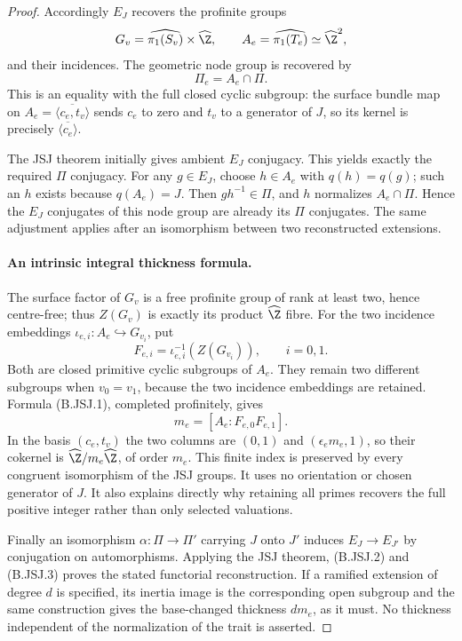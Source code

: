 \begin{proof}
Accordingly $E_J$ recovers the profinite groups
\[
 G_v=\widehat{\pi_1(S_v)}\times\widehat\Z,
 \qquad A_e=\widehat{\pi_1(T_e)}\simeq\widehat\Z^2,
\]
and their incidences. The geometric node group is recovered by
\[
                         \Pi_e=A_e\cap\Pi.
\tag{B.JSJ.2}
\]
This is an equality with the full closed cyclic subgroup: the surface
bundle map on $A_e=\overline{\langle c_e,t_v\rangle}$ sends $c_e$
to zero and $t_v$ to a generator of $J$, so its kernel is precisely
$\overline{\langle c_e\rangle}$.

The JSJ theorem initially gives ambient $E_J$ conjugacy. This yields
exactly the required $\Pi$ conjugacy. For any $g\in E_J$, choose
$h\in A_e$ with $q(h)=q(g)$; such an $h$ exists because
$q(A_e)=J$. Then $gh^{-1}\in\Pi$, and $h$ normalizes
$A_e\cap\Pi$. Hence the $E_J$ conjugates of this node group are
already its $\Pi$ conjugates. The same adjustment applies after an
isomorphism between two reconstructed extensions.

\paragraph{An intrinsic integral thickness formula.}
The surface factor of $G_v$ is a free profinite group of rank at least
two, hence centre-free; thus $Z(G_v)$ is exactly its product
$\widehat\Z$ fibre. For the two incidence embeddings
$\iota_{e,i}:A_e\hookrightarrow G_{v_i}$, put
\[
 F_{e,i}=\iota_{e,i}^{-1}(Z(G_{v_i})),\qquad i=0,1.
\]
Both are closed primitive cyclic subgroups of $A_e$. They remain two
different subgroups when $v_0=v_1$, because the two incidence embeddings
are retained. Formula (B.JSJ.1), completed profinitely, gives
\[
 \boxed{\quad m_e=[A_e:F_{e,0}F_{e,1}].\quad}
\tag{B.JSJ.3}
\]
In the basis $(c_e,t_v)$ the two columns are $(0,1)$ and
$(\epsilon_em_e,1)$, so their cokernel is
$\widehat\Z/m_e\widehat\Z$, of order $m_e$.
This finite index is preserved by every congruent isomorphism of the
JSJ groups. It uses no orientation or chosen generator of $J$.
It also explains directly why retaining all primes recovers the full
positive integer rather than only selected valuations.

Finally an isomorphism $\alpha:\Pi\to\Pi'$ carrying $J$ onto $J'$
induces $E_J\to E_{J'}$ by conjugation on automorphisms. Applying the
JSJ theorem, (B.JSJ.2) and (B.JSJ.3) proves the stated functorial
reconstruction. If a ramified extension of degree $d$ is specified,
its inertia image is the corresponding open subgroup and the same
construction gives the base-changed thickness $dm_e$, as it must.
No thickness independent of the normalization of the trait is asserted.
\end{proof}
